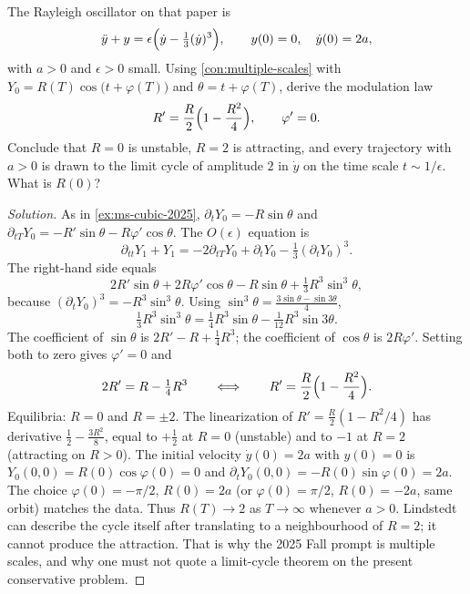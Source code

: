 \documentclass[11pt,a4paper]{article}
\begin{document}
\begin{exercise}
\label{exer:ms-rayleigh}
The Rayleigh oscillator on that paper is
\[
\ddot y+y
=
\epsilon\Bigl(\dot y-\tfrac13(\dot y)^{3}\Bigr),
\qquad
y(0)=0,\quad \dot y(0)=2a,
\]
with \(a>0\) and \(\epsilon>0\) small. Using \cref{con:multiple-scales} with \(Y_{0}=R(T)\cos\bigl(t+\varphi(T)\bigr)\) and \(\theta=t+\varphi(T)\), derive the modulation law
\[
R'
=
\frac{R}{2}\Bigl(1-\frac{R^{2}}{4}\Bigr),
\qquad
\varphi'=0.
\]
Conclude that \(R=0\) is unstable, \(R=2\) is attracting, and every trajectory with \(a>0\) is drawn to the limit cycle of amplitude \(2\) in \(\dot y\) on the time scale \(t\sim 1/\epsilon\). What is \(R(0)\)?
\end{exercise}

\begin{proof}[Solution]
As in \cref{ex:ms-cubic-2025}, \(\partial_{t}Y_{0}=-R\sin\theta\) and \(\partial_{tT}Y_{0}=-R'\sin\theta-R\varphi'\cos\theta\). The \(O(\epsilon)\) equation is
\[
\partial_{tt}Y_{1}+Y_{1}
=
-2\partial_{tT}Y_{0}+\partial_{t}Y_{0}-\tfrac13(\partial_{t}Y_{0})^{3}.
\]
The right-hand side equals
\[
2R'\sin\theta+2R\varphi'\cos\theta-R\sin\theta+\tfrac13 R^{3}\sin^{3}\theta,
\]
because \((\partial_{t}Y_{0})^{3}=-R^{3}\sin^{3}\theta\). Using \(\sin^{3}\theta=\frac{3\sin\theta-\sin 3\theta}{4}\),
\[
\tfrac13 R^{3}\sin^{3}\theta
=
\tfrac14 R^{3}\sin\theta-\tfrac{1}{12}R^{3}\sin 3\theta.
\]
The coefficient of \(\sin\theta\) is \(2R'-R+\frac14 R^{3}\); the coefficient of \(\cos\theta\) is \(2R\varphi'\). Setting both to zero gives \(\varphi'=0\) and
\[
2R'=R-\tfrac14 R^{3}
\qquad\Longleftrightarrow\qquad
R'=\frac{R}{2}\Bigl(1-\frac{R^{2}}{4}\Bigr).
\]
Equilibria: \(R=0\) and \(R=\pm 2\). The linearization of \(R'=\frac R2(1-R^{2}/4)\) has derivative \(\frac12-\frac{3R^{2}}{8}\), equal to \(+\frac12\) at \(R=0\) (unstable) and to \(-1\) at \(R=2\) (attracting on \(R>0\)). The initial velocity \(\dot y(0)=2a\) with \(y(0)=0\) is \(Y_{0}(0,0)=R(0)\cos\varphi(0)=0\) and \(\partial_{t}Y_{0}(0,0)=-R(0)\sin\varphi(0)=2a\). The choice \(\varphi(0)=-\pi/2\), \(R(0)=2a\) (or \(\varphi(0)=\pi/2\), \(R(0)=-2a\), same orbit) matches the data. Thus \(R(T)\to 2\) as \(T\to\infty\) whenever \(a>0\). Lindstedt can describe the cycle itself after translating to a neighbourhood of \(R=2\); it cannot produce the attraction. That is why the 2025 Fall prompt is multiple scales, and why one must not quote a limit-cycle theorem on the present conservative problem.
\end{proof}
\end{document}
